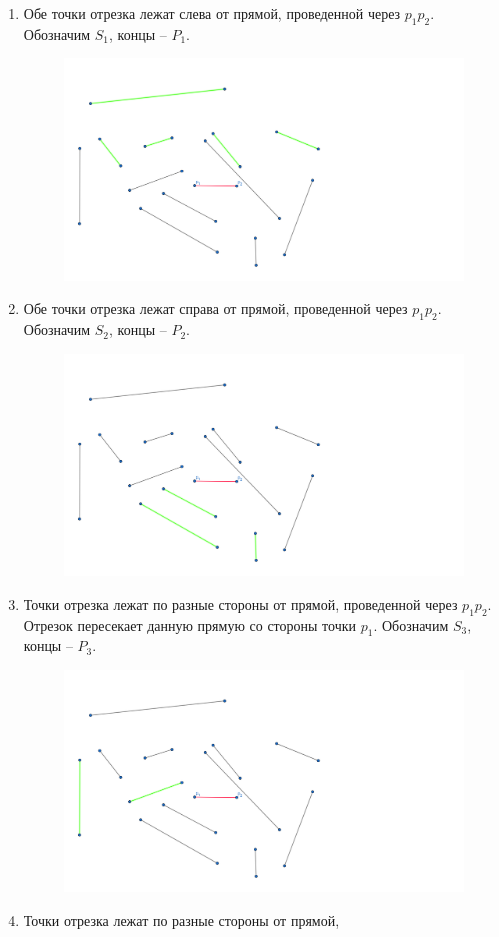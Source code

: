 \documentclass[letterpaper,12pt]{article}
\begin{document}
\begin{enumerate}
      \item Обе точки отрезка лежат слева от прямой, проведенной 
            через $p_1 p_2$. Обозначим $S_1$, концы -- $P_1$.
            \begin{figure}[H]
                  \centering
                  \includegraphics[width=0.5\linewidth]{segment_1.png}
            \end{figure}
      \item Обе точки отрезка лежат справа от прямой, проведенной 
            через $p_1 p_2$. Обозначим $S_2$, концы -- $P_2$.
            \begin{figure}[H]
                  \centering
                  \includegraphics[width=0.5\linewidth]{segment_2.png}
            \end{figure}
      \item Точки отрезка лежат по разные стороны от прямой, 
            проведенной через $p_1 p_2$. Отрезок пересекает
            данную прямую со стороны точки $p_1$. 
            Обозначим $S_3$, концы -- $P_3$.
            \begin{figure}[H]
                  \centering
                  \includegraphics[width=0.5\linewidth]{segment_3.png}
            \end{figure}
      \item Точки отрезка лежат по разные стороны от прямой, 

\end{enumerate}
\end{document}
